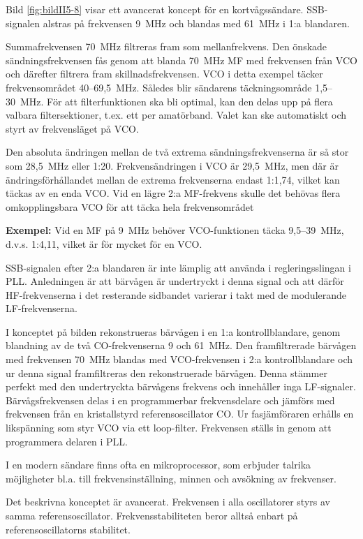 Bild \ref{fig:bildII5-8} visar ett avancerat koncept för en kortvågssändare.
SSB-signalen alstras på frekvensen 9~MHz och blandas med 61~MHz i 1:a
blandaren.

Summafrekvensen 70~MHz filtreras fram som mellanfrekvens.
Den önskade sändningsfrekvensen fås genom att blanda 70~MHz MF med
frekvensen från VCO och därefter filtrera fram skillnadsfrekvensen.
VCO i detta exempel täcker frekvensområdet 40--69,5~MHz.
Således blir sändarens täckningsområde 1,5--30~MHz.
För att filterfunktionen ska bli optimal, kan den delas upp på flera
valbara filtersektioner, t.ex. ett per amatörband.
Valet kan ske automatiskt och styrt av frekvensläget på VCO.

Den absoluta ändringen mellan de två extrema sändningsfrekvenserna är
så stor som 28,5~MHz eller 1:20.
Frekvensändringen i VCO är 29,5~MHz, men där är ändringsförhållandet
mellan de extrema frekvenserna endast 1:1,74, vilket kan täckas av en enda VCO.
Vid en lägre 2:a MF-frekvens skulle det behövas flera omkopplingsbara
VCO för att täcka hela frekvensområdet

\textbf{Exempel:} Vid en MF på 9~MHz behöver VCO-funktionen täcka 9,5--39~MHz,
d.v.s. 1:4,11, vilket är för mycket för en VCO.

SSB-signalen efter 2:a blandaren är inte lämplig att använda i
regleringsslingan i PLL.
Anledningen är att bärvågen är undertryckt i denna signal och att därför
HF-frekvenserna i det resterande sidbandet varierar i takt med de
modulerande LF-frekvenserna.

I konceptet på bilden rekonstrueras bärvågen i en 1:a kontrollblandare,
genom blandning av de två CO-frekvenserna 9 och 61~MHz.
Den framfiltrerade bärvågen med frekvensen 70~MHz blandas med
VCO-frekvensen i 2:a kontrollblandare och ur denna signal
framfiltreras den rekonstruerade bärvågen.
Denna stämmer perfekt med den undertryckta bärvågens frekvens och
innehåller inga LF-signaler.
Bärvågsfrekvensen delas i en programmerbar frekvensdelare och jämförs
med frekvensen från en kristallstyrd referensoscillator CO.
Ur fasjämföraren erhålls en likspänning som styr VCO via ett loop-filter.
Frekvensen ställs in genom att programmera delaren i PLL.

I en modern sändare finns ofta en mikroprocessor, som erbjuder talrika
möjligheter bl.a. till frekvensinställning, minnen och avsökning av
frekvenser.

Det beskrivna konceptet är avancerat.
Frekvensen i alla oscillatorer styrs av samma referensoscillator.
Frekvensstabiliteten beror alltså enbart på referensoscillatorns stabilitet.

